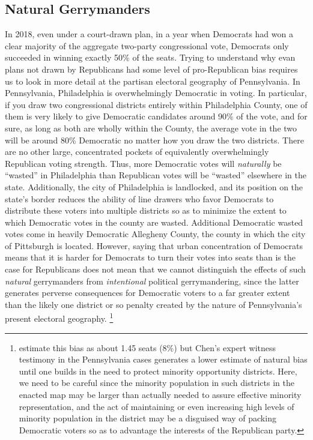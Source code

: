         \subsection*{Natural Gerrymanders}
    In 2018, even under a court-drawn plan, in a year when Democrats had won a clear majority of the aggregate two-party congressional vote, Democrats only succeeded in winning exactly 50\% of the seats. Trying to understand why evan plans not drawn by Republicans had some level of pro-Republican bias requires us to look in more detail at the partisan electoral geography of Pennsylvania. In Pennsylvania, Philadelphia is overwhelmingly Democratic in voting. In particular, if you draw two congressional districts entirely within Philadelphia County, one of them is very likely to give Democratic candidates around 90\% of the vote, and for sure, as long as both are wholly within the County, the average vote in the two will be around 80\% Democratic no matter how you draw the two districts. There are no other large, concentrated pockets of equivalently overwhelmingly Republican voting strength. Thus, more Democratic votes will \textit{naturally} be ``wasted'' in Philadelphia than Republican votes will be ``wasted'' elsewhere in the state. Additionally, the city of Philadelphia is landlocked, and its position on the state's border reduces the ability of line drawers who favor Democrats to distribute these voters into multiple districts so as to minimize the extent to which Democratic votes in the county are wasted. Additional Democratic wasted votes come in heavily Democratic Allegheny County, the county in which the city of Pittsburgh is located. However, saying that urban concentration of Democrats means that it is harder for Democrats to turn their votes into seats than is the case for Republicans does not mean that we cannot distinguish the effects of such \textit{natural} gerrymanders from \textit{intentional} political gerrymandering, since the latter generates perverse consequences for Democratic voters to a far greater extent than the likely one district or so penalty created by the nature of Pennsylvania’s present electoral geography. 
        \footnote{\citet{Chen2013} estimate this bias as about 1.45 seats (8\%) but Chen’s expert witness testimony in the Pennsylvania cases generates a lower estimate of natural bias until one builds in the need to protect minority opportunity districts. Here, we need to be careful since the minority population in such districts in the enacted map may be larger than actually needed to assure effective minority representation, and the act of maintaining or even increasing high levels of minority population in the district may be a disguised way of packing Democratic voters so as to advantage the interests of the Republican party.}
